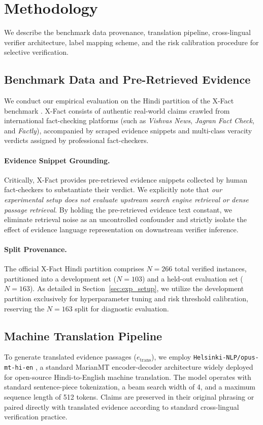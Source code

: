 \section{Methodology}
\label{sec:methodology}

We describe the benchmark data provenance, translation pipeline, cross-lingual verifier architecture, label mapping scheme, and the risk calibration procedure for selective verification.

\subsection{Benchmark Data and Pre-Retrieved Evidence}
We conduct our empirical evaluation on the Hindi partition of the X-Fact benchmark \citep{gupta-srikumar-2021-xfact}. X-Fact consists of authentic real-world claims crawled from international fact-checking platforms (such as \emph{Vishvas News}, \emph{Jagran Fact Check}, and \emph{Factly}), accompanied by scraped evidence snippets and multi-class veracity verdicts assigned by professional fact-checkers.

\paragraph{Evidence Snippet Grounding.}
Critically, X-Fact provides pre-retrieved evidence snippets collected by human fact-checkers to substantiate their verdict. We explicitly note that \emph{our experimental setup does not evaluate upstream search engine retrieval or dense passage retrieval}. By holding the pre-retrieved evidence text constant, we eliminate retrieval noise as an uncontrolled confounder and strictly isolate the effect of evidence language representation on downstream verifier inference.

\paragraph{Split Provenance.}
The official X-Fact Hindi partition comprises $N=266$ total verified instances, partitioned into a development set ($N=103$) and a held-out evaluation set ($N=163$). As detailed in Section~\ref{sec:exp_setup}, we utilize the development partition exclusively for hyperparameter tuning and risk threshold calibration, reserving the $N=163$ split for diagnostic evaluation.

\subsection{Machine Translation Pipeline}
To generate translated evidence passages ($e_{\text{trans}}$), we employ \texttt{Helsinki-NLP/opus-mt-hi-en} \citep{tiedemann-thottingal-2020-opus}, a standard MarianMT encoder-decoder architecture widely deployed for open-source Hindi-to-English machine translation. The model operates with standard sentence-piece tokenization, a beam search width of 4, and a maximum sequence length of 512 tokens. Claims are preserved in their original phrasing or paired directly with translated evidence according to standard cross-lingual verification practice.

